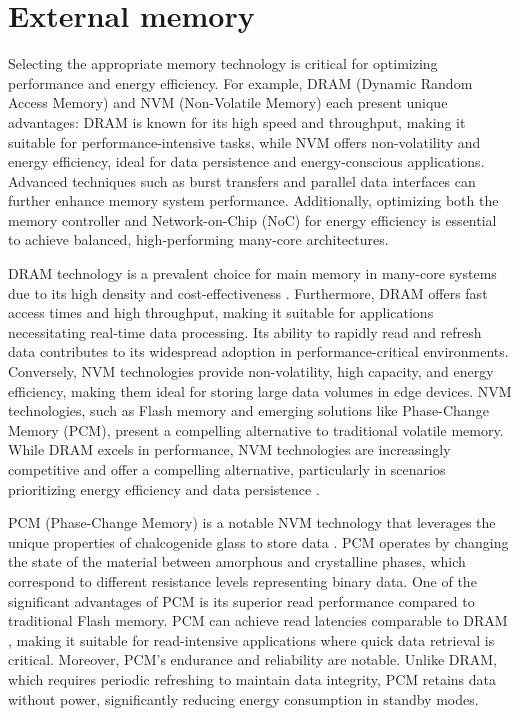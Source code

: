 \section{External memory}

Selecting the appropriate memory technology is critical for optimizing performance and energy efficiency.
For example, DRAM (Dynamic Random Access Memory) and NVM (Non-Volatile Memory) each present unique advantages: DRAM is known for its high speed and throughput, making it suitable for performance-intensive tasks, while NVM offers non-volatility and energy efficiency, ideal for data persistence and energy-conscious applications.
Advanced techniques such as burst transfers and parallel data interfaces can further enhance memory system performance.
Additionally, optimizing both the memory controller and Network-on-Chip (NoC) for energy efficiency is essential to achieve balanced, high-performing many-core architectures.

DRAM technology is a prevalent choice for main memory in many-core systems due to its high density and cost-effectiveness \cite{oExploringEnergyefficientDRAM2011}. Furthermore, DRAM offers fast access times and high throughput, making it suitable for applications necessitating real-time data processing. Its ability to rapidly read and refresh data contributes to its widespread adoption in performance-critical environments.
Conversely, NVM technologies provide non-volatility, high capacity, and energy efficiency, making them ideal for storing large data volumes in edge devices. NVM technologies, such as Flash memory and emerging solutions like Phase-Change Memory (PCM), present a compelling alternative to traditional volatile memory.
While DRAM excels in performance, NVM technologies are increasingly competitive and offer a compelling alternative, particularly in scenarios prioritizing energy efficiency and data persistence \cite{dulloorSystemSoftwarePersistent2014}.

PCM (Phase-Change Memory) is a notable NVM technology that leverages the unique properties of chalcogenide glass to store data \cite{meenaOverviewEmergingNonvolatile2014}.
PCM operates by changing the state of the material between amorphous and crystalline phases, which correspond to different resistance levels representing binary data.
One of the significant advantages of PCM is its superior read performance compared to traditional Flash memory.
PCM can achieve read latencies comparable to DRAM \cite{wangExploringHybridMemory2013}, making it suitable for read-intensive applications where quick data retrieval is critical.
Moreover, PCM's endurance and reliability are notable.
Unlike DRAM, which requires periodic refreshing to maintain data integrity, PCM retains data without power, significantly reducing energy consumption in standby modes.

